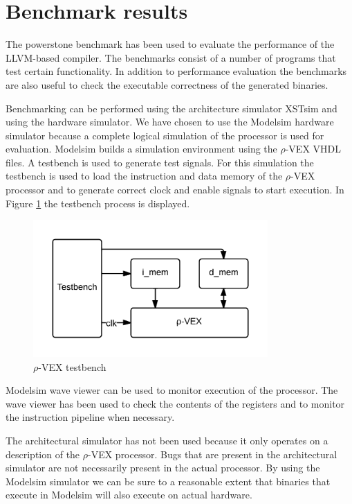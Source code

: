 \section{Benchmark results}
The powerstone benchmark \cite{Jeff-Scott:1998fj} has been used to evaluate the performance of the LLVM-based compiler. The benchmarks consist of a number of programs that test certain functionality. In addition to performance evaluation the benchmarks are also useful to check the executable correctness of the generated binaries.

Benchmarking can be performed using the architecture simulator XSTsim and using the hardware simulator. We have chosen to use the Modelsim hardware simulator because a complete logical simulation of the processor is used for evaluation. Modelsim builds a simulation environment using the $\rho$-VEX VHDL files. A testbench is used to generate test signals. For this simulation the testbench is used to load the instruction and data memory of the $\rho$-VEX processor and to generate correct clock and enable signals to start execution. In Figure \ref{fig:rvex_tb} the testbench process is displayed.

\begin{figure}[ht]
\centering
\includegraphics[width=0.8\textwidth]{5_results/img/testbench.png}
\caption{$\rho$-VEX testbench}
\label{fig:rvex_tb}
\end{figure}

Modelsim wave viewer can be used to monitor execution of the processor. The wave viewer has been used to check the contents of the registers and to monitor the instruction pipeline when necessary.

The architectural simulator has not been used because it only operates on a description of the $\rho$-VEX processor. Bugs that are present in the architectural simulator are not necessarily present in the actual processor. By using the Modelsim simulator we can be sure to a reasonable extent that binaries that execute in Modelsim will also execute on actual hardware. 

